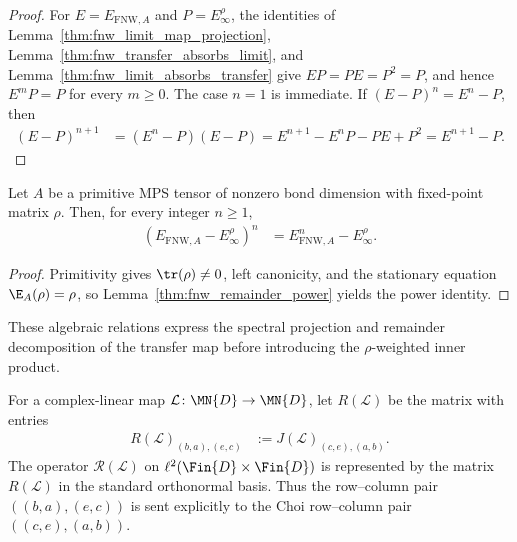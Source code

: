 \begin{proof}
    \leanok
    For $E=E_{\mathrm{FNW},A}$ and $P=E_\infty^\rho$, the identities of
    Lemma~\ref{thm:fnw_limit_map_projection},
    Lemma~\ref{thm:fnw_transfer_absorbs_limit}, and
    Lemma~\ref{thm:fnw_limit_absorbs_transfer} give
    $EP=PE=P^2=P$, and hence $E^mP=P$ for every $m\geq0$. The case $n=1$ is
    immediate. If $(E-P)^n=E^n-P$, then
    \begin{align}
        (E-P)^{n+1}
         & =(E^n-P)(E-P)
        =E^{n+1}-E^nP-PE+P^2
        =E^{n+1}-P.
    \end{align}
\end{proof}

\begin{lemma}
    \label{thm:primitive_fnw_remainder_power}
    \leanok
    Let $A$ be a primitive MPS tensor of nonzero bond dimension with fixed-point
    matrix $\rho$. Then, for every integer $n\geq1$,
    \begin{align}
        (E_{\mathrm{FNW},A}-E_\infty^\rho)^n
         & =E_{\mathrm{FNW},A}^n-E_\infty^\rho.
    \end{align}
\end{lemma}

\begin{proof}
    \leanok
    Primitivity gives $\tr(\rho)\neq0$, left canonicity, and the stationary
    equation $\E_A(\rho)=\rho$, so
    Lemma~\ref{thm:fnw_remainder_power} yields the power identity.
\end{proof}

These algebraic relations express the spectral projection and remainder
decomposition of the transfer map before introducing the $\rho$-weighted inner
product.

\begin{definition}
    \label{def:gram_reshuffle}
    \leanok

    For a complex-linear map $\mathcal L\colon\MN{D}\to\MN{D}$, let
    $R(\mathcal L)$ be the matrix with entries
    \begin{align}
        R(\mathcal L)_{(b,a),(e,c)}
         & :=J(\mathcal L)_{(c,e),(a,b)}.
        \label{eq:gram_reshuffle_matrix_entries}
    \end{align}
    The operator $\mathscr R(\mathcal L)$ on
    $\ell^2(\Fin{D}\times\Fin{D})$ is represented by the matrix $R(\mathcal L)$
    in the standard orthonormal basis.
    Thus the row--column pair $((b,a),(e,c))$ is sent explicitly to the Choi
    row--column pair $((c,e),(a,b))$.
\end{definition}

